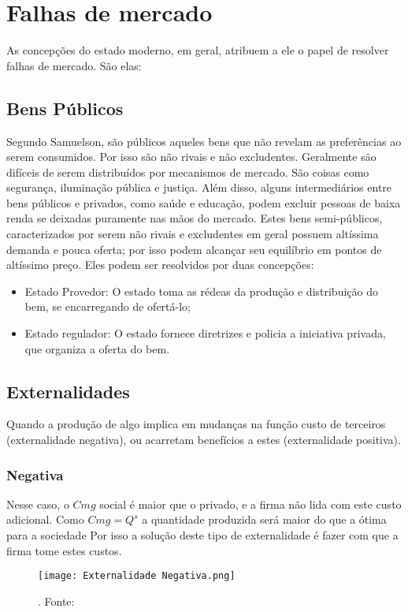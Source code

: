 \documentclass[12pt,a4paper,oneside,brazil]{abntex2}
\begin{document}
\section{Falhas de mercado}
As concepções do estado moderno, em geral, atribuem a ele o papel de resolver falhas de mercado. São elas:
\subsection{Bens Públicos}
Segundo Samuelson, são públicos aqueles bens que não revelam as preferências ao serem consumidos. Por isso são não rivais e não excludentes. Geralmente são difíceis de serem distribuídos por mecanismos de mercado. São coisas como segurança, iluminação pública e justiça. Além disso, alguns intermediários entre bens públicos e privados, como saúde e educação, podem excluir pessoas de baixa renda se deixadas puramente nas mãos do mercado. Estes bens semi-públicos, caracterizados por serem não rivais e excludentes em geral possuem altíssima demanda e pouca oferta; por isso podem alcançar seu equilíbrio em pontos de altíssimo preço. Eles podem ser resolvidos por duas concepções:
\begin{itemize}
\item Estado Provedor: O estado toma as rédeas da produção e distribuição do bem, se encarregando de ofertá-lo;
\item Estado regulador: O estado fornece diretrizes e policia a iniciativa privada, que organiza a oferta do bem.
\end{itemize}

\subsection{Externalidades}
Quando a produção de algo implica em mudanças na função custo de terceiros (externalidade negativa), ou acarretam benefícios a estes (externalidade positiva).
\subsubsection{Negativa}
Nesse caso, o $Cmg$ social é maior que o privado, e a firma não lida com este custo adicional. Como $Cmg = Q^s$ a quantidade produzida será maior do que a ótima para a sociedade Por isso a solução deste tipo de externalidade é fazer com que a firma tome estes custos.

\begin{figure}[ht]
\texttt{[image: Externalidade Negativa.png]}
\centering
\caption{. Fonte: \cite{biderman}}
\end{figure}
\end{document}
